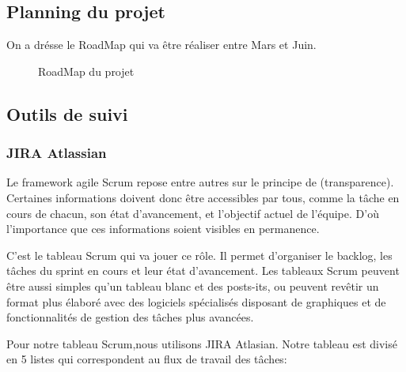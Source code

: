 \subsection{Planning du projet}

On a dr\'esse le RoadMap qui va \^etre r\'ealiser entre Mars et Juin.

\begin{figure}[!htb]
	\caption{\label{fig:my-label} RoadMap du projet}
\end{figure}

\subsection{Outils de suivi}

\subsubsection{JIRA Atlassian}

Le framework agile Scrum repose entre autres sur le principe de (transparence). Certaines informations doivent donc \^etre accessibles par tous, comme la t\^ache en cours de chacun, son \'etat d'avancement, et l'objectif actuel de l'\'equipe. D'o\`u l'importance que ces informations soient visibles en permanence.

C'est le tableau Scrum qui va jouer ce r\^ole. Il permet d'organiser le backlog, les t\^aches du sprint en cours et leur \'etat d'avancement. Les tableaux Scrum peuvent \^etre aussi simples qu'un tableau blanc et des posts-its, ou peuvent rev\^etir un format plus \'elabor\'e avec des logiciels sp\'ecialis\'es disposant de graphiques et de fonctionnalit\'es de gestion des t\^aches plus avanc\'ees.

Pour notre tableau Scrum,nous utilisons JIRA Atlasian. Notre tableau est divis\'e en 5 listes qui correspondent au flux de travail des t\^aches:

